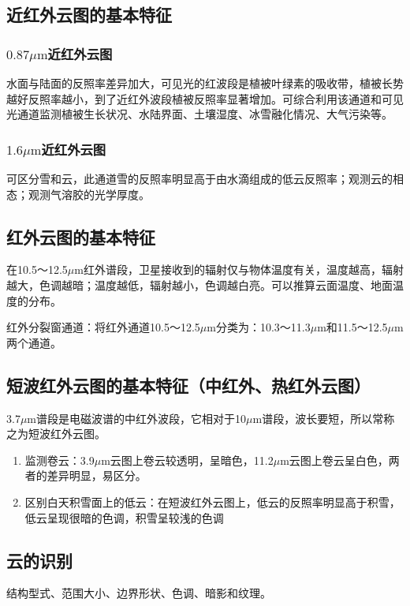 \documentclass[UTF8,11pt]{ctexbook}
\begin{document}
\subsection{近红外云图的基本特征}

\subsubsection{\(0.87\mu\mathrm{m}\)近红外云图}

水面与陆面的反照率差异加大，可见光的红波段是植被叶绿素的吸收带，植被长势越好反照率越小，到了近红外波段植被反照率显著增加。可综合利用该通道和可见光通道监测植被生长状况、水陆界面、土壤湿度、冰雪融化情况、大气污染等。

\subsubsection{\(1.6\mu\mathrm{m}\)近红外云图}

可区分雪和云，此通道雪的反照率明显高于由水滴组成的低云反照率；观测云的相态；观测气溶胶的光学厚度。

\subsection{红外云图的基本特征}

在10.5～12.5\(\mu\)m红外谱段，卫星接收到的辐射仅与物体温度有关，温度越高，辐射越大，色调越暗；温度越低，辐射越小，色调越白亮。可以推算云面温度、地面温度的分布。

红外分裂窗通道：将红外通道10.5～12.5\(\mu\)m分类为：10.3～11.3\(\mu\)m和11.5～12.5\(\mu\)m两个通道。

\subsection{短波红外云图的基本特征（中红外、热红外云图）}

3.7\(\mu\)m谱段是电磁波谱的中红外波段，它相对于10\(\mu\)m谱段，波长要短，所以常称之为短波红外云图。
\begin{enumerate}
    \item 监测卷云：3.9\(\mu\)m云图上卷云较透明，呈暗色，11.2\(\mu\)m云图上卷云呈白色，两者的差异明显，易区分。
    \item 区别白天积雪面上的低云：在短波红外云图上，低云的反照率明显高于积雪，低云呈现很暗的色调，积雪呈较浅的色调
\end{enumerate}

\subsection{云的识别}

结构型式、范围大小、边界形状、色调、暗影和纹理。
\end{document}
